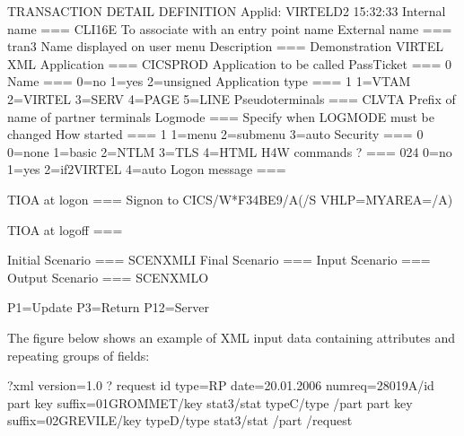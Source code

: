 \documentclass[letterpaper,10pt,english]{sphinxmanual}
\begin{document}
\begin{sphinxVerbatim}[commandchars=\\\{\}]
TRANSACTION DETAIL DEFINITION \PYGZhy{}\PYGZhy{}\PYGZhy{}\PYGZhy{}\PYGZhy{}\PYGZhy{}\PYGZhy{}\PYGZhy{}\PYGZhy{}\PYGZhy{}\PYGZhy{}\PYGZhy{}\PYGZhy{}\PYGZhy{}\PYGZhy{}\PYGZhy{}\PYGZhy{}\PYGZhy{}\PYGZhy{}\PYGZhy{}\PYGZhy{}\PYGZhy{} Applid: VIRTELD2 15:32:33
Internal name ===\PYGZgt{} CLI\PYGZhy{}16E                To associate with an entry point name
External name ===\PYGZgt{} tran3                  Name displayed on user menu
Description   ===\PYGZgt{} Demonstration VIRTEL XML
Application   ===\PYGZgt{} CICSPROD               Application to be called
PassTicket    ===\PYGZgt{} 0 Name ===\PYGZgt{}            0=no 1=yes 2=unsigned
Application type ===\PYGZgt{} 1                   1=VTAM 2=VIRTEL 3=SERV 4=PAGE 5=LINE
Pseudo\PYGZhy{}terminals ===\PYGZgt{} CLVTA               Prefix of name of partner terminals
Logmode          ===\PYGZgt{}                     Specify when LOGMODE must be changed
How started      ===\PYGZgt{} 1                   1=menu 2=sub\PYGZhy{}menu 3=auto
Security         ===\PYGZgt{} 0                   0=none 1=basic 2=NTLM 3=TLS 4=HTML
H4W commands ?   ===\PYGZgt{} 024                 0=no 1=yes 2=if2VIRTEL 4=auto
Logon message    ===\PYGZgt{}

TIOA at logon    ===\PYGZgt{} Signon to CICS\PYGZam{}/W\PYGZam{}*F34BE9\PYGZam{}/A\PYGZam{}(\PYGZam{}/S VHLP\PYGZam{}=MYAREA=\PYGZam{}/A\PYGZam{})

TIOA at logoff   ===\PYGZgt{}

Initial Scenario ===\PYGZgt{} SCENXMLI            Final Scenario ===\PYGZgt{}
Input Scenario   ===\PYGZgt{}                     Output Scenario ===\PYGZgt{} SCENXMLO

P1=Update                          P3=Return                        P12=Server
\end{sphinxVerbatim}



The figure below shows an example of XML input data containing attributes and repeating groups of fields:

\begin{sphinxVerbatim}[commandchars=\\\{\}]
\PYGZlt{}?xml version=\PYGZdq{}1.0\PYGZdq{} ?\PYGZgt{}
\PYGZlt{}request\PYGZgt{}
\PYGZlt{}id type=\PYGZdq{}RP\PYGZdq{} date=\PYGZdq{}20.01.2006\PYGZdq{} numreq=\PYGZdq{}2\PYGZdq{}\PYGZgt{}8019A\PYGZlt{}/id\PYGZgt{}
\PYGZlt{}part\PYGZgt{}
    \PYGZlt{}key suffix=\PYGZdq{}01\PYGZdq{}\PYGZgt{}GROMMET\PYGZlt{}/key\PYGZgt{}
    \PYGZlt{}stat\PYGZgt{}3\PYGZlt{}/stat\PYGZgt{}
    \PYGZlt{}type\PYGZgt{}C\PYGZlt{}/type\PYGZgt{}
\PYGZlt{}/part\PYGZgt{}
\PYGZlt{}part\PYGZgt{}
    \PYGZlt{}key suffix=\PYGZdq{}02\PYGZdq{}\PYGZgt{}GREVILE\PYGZlt{}/key\PYGZgt{}
    \PYGZlt{}type\PYGZgt{}D\PYGZlt{}/type\PYGZgt{}
    \PYGZlt{}stat\PYGZgt{}3\PYGZlt{}/stat\PYGZgt{}
\PYGZlt{}/part\PYGZgt{}
\PYGZlt{}/request\PYGZgt{}
\end{sphinxVerbatim}
\end{document}
